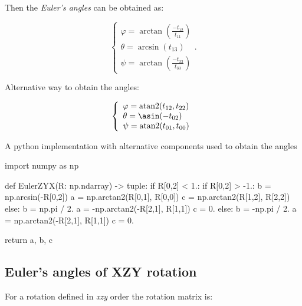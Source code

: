     Then the \textit{Euler's angles} can be obtained as:

    \begin{equation}
        \left\{ \begin{array}{l}
            \varphi = \arctan \left( \frac{-t_{12}}{t_{11}} \right)\\
            \theta = \arcsin \left( t_{13} \right) \\
            \psi = \arctan \left( \frac{-t_{23}}{t_{33}} \right)
        \end{array} \right.
    .\end{equation}

    Alternative way to obtain the angles:

    \begin{equation}
        \left\{ \begin{array}{l}
            \varphi = \atantwo(t_{12}, t_{22}) \\
            \theta = \asin(-t_{02}) \\
            \psi = \atantwo(t_{01}, t_{00})
        \end{array} \right.
    \end{equation}

    A python implementation with alternative components used to obtain the angles

\begin{python}
import numpy as np

def EulerZYX(R: np.ndarray) -> tuple:
    if R[0,2] < 1.:
        if R[0,2] > -1.:
            b = np.arcsin(-R[0,2])
            a = np.arctan2(R[0,1], R[0,0])
            c = np.arctan2(R[1,2], R[2,2])
        else:
            b = np.pi / 2.
            a = -np.arctan2(-R[2,1], R[1,1])
            c = 0.
    else:
        b = -np.pi / 2.
        a = np.arctan2(-R[2,1], R[1,1])
        c = 0.

    return a, b, c
\end{python}


\subsection{Euler's angles of \textbf{XZY} rotation}

    For a rotation defined in \textit{xzy} order the rotation matrix is:

